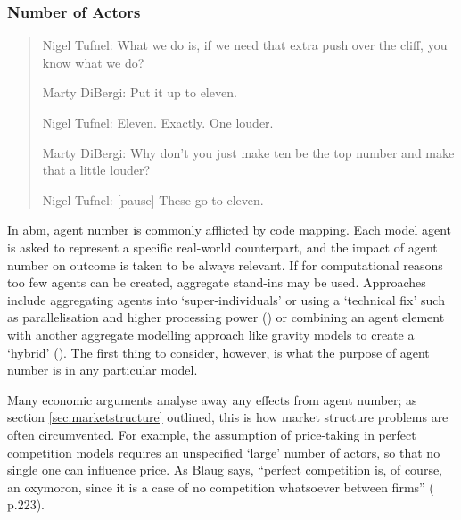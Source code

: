 {\subsubsection{Number of Actors \label{sec:agentnumbers}}

\begin{quote}
Nigel Tufnel: What we do is, if we need that extra push over the cliff, you know what we do?

Marty DiBergi: Put it up to eleven.

Nigel Tufnel: Eleven. Exactly. One louder.

Marty DiBergi: Why don't you just make ten be the top number and make that a little louder?

Nigel Tufnel: [pause] These go to eleven.
\end{quote}
\hspace*{10cm}\emph{\citealt{reiner_this_1984}}
\vspace{1cm}

In \gls{abm}, agent number is commonly afflicted by code mapping. Each model agent is asked to represent a specific real-world counterpart, and the impact of agent number on outcome is taken to be always relevant. If for computational reasons too few agents can be created, aggregate stand-ins may be used. Approaches include aggregating agents into `super-individuals' or using a `technical fix' such as parallelisation and higher processing power (\citealt{parry_comparative_2008}) or combining an agent element with another aggregate modelling approach like gravity models to create a `hybrid' (\citealt{heppenstall_hybrid_2005}). The first thing to consider, however, is what the purpose of agent number is in any particular model.

Many economic arguments analyse away any effects from agent number; as section \ref{sec:marketstructure} outlined, this is how market structure problems are often circumvented. For example, the assumption of price-taking in perfect competition models requires an unspecified `large' number of actors, so that no single one can influence price. As Blaug says, ``perfect competition is, of course, an oxymoron, since it is a case of no competition whatsoever between firms'' (\citealt{blaug_trade-off_2009} p.223).

}
